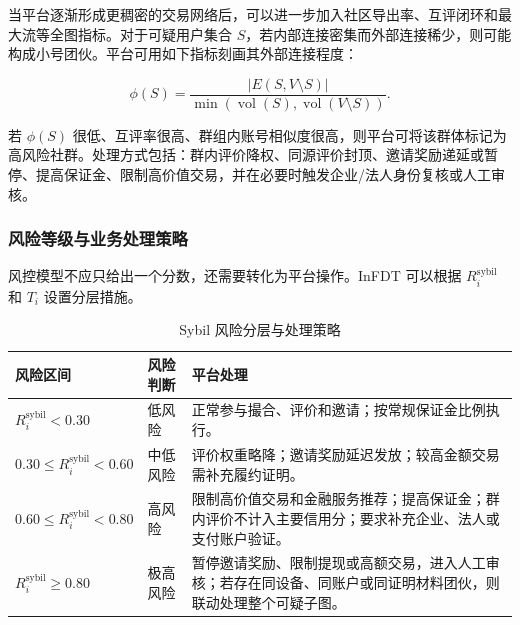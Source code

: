 \documentclass[UTF8,11pt]{ctexart}
\begin{document}
当平台逐渐形成更稠密的交易网络后，可以进一步加入社区导出率、互评闭环和最大流等全图指标。对于可疑用户集合 $S$，若内部连接密集而外部连接稀少，则可能构成小号团伙。平台可用如下指标刻画其外部连接程度：

\[
    \phi(S)
    =
    \frac{|E(S,V\setminus S)|}
    {\min(\operatorname{vol}(S),\operatorname{vol}(V\setminus S))}.
\]

若 $\phi(S)$ 很低、互评率很高、群组内账号相似度很高，则平台可将该群体标记为高风险社群。处理方式包括：群内评价降权、同源评价封顶、邀请奖励递延或暂停、提高保证金、限制高价值交易，并在必要时触发企业/法人身份复核或人工审核。

\subsubsection*{风险等级与业务处理策略}

风控模型不应只给出一个分数，还需要转化为平台操作。InFDT 可以根据 $R_i^{\mathrm{sybil}}$ 和 $T_i$ 设置分层措施。

\begin{table}[h]
    \centering
    \caption{Sybil 风险分层与处理策略}
    \begin{tabularx}{\textwidth}{p{2.7cm}p{3cm}Y}
        \toprule
        风险区间                                 & 风险判断 & 平台处理                                                    \\
        \midrule
        $R_i^{\mathrm{sybil}}<0.30$          & 低风险  & 正常参与撮合、评价和邀请；按常规保证金比例执行。                                \\
        $0.30\leq R_i^{\mathrm{sybil}}<0.60$ & 中低风险 & 评价权重略降；邀请奖励延迟发放；较高金额交易需补充履约证明。                          \\
        $0.60\leq R_i^{\mathrm{sybil}}<0.80$ & 高风险  & 限制高价值交易和金融服务推荐；提高保证金；群内评价不计入主要信用分；要求补充企业、法人或支付账户验证。     \\
        $R_i^{\mathrm{sybil}}\geq0.80$       & 极高风险 & 暂停邀请奖励、限制提现或高额交易，进入人工审核；若存在同设备、同账户或同证明材料团伙，则联动处理整个可疑子图。 \\
        \bottomrule
    \end{tabularx}
\end{table}
\end{document}

